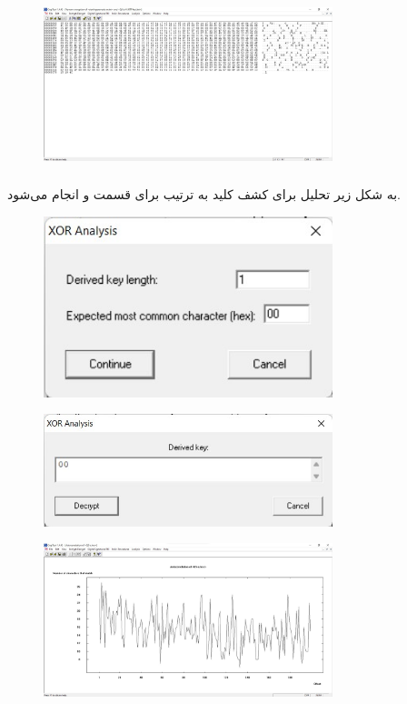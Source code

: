 \documentclass{article}
\begin{document}
\begin{figure}[H]
    \centering
    \includegraphics[width=0.75\textwidth]{figures/5b1.jpg}
    \caption
	{}
    \label{fig:fig1}
\end{figure}

\subsubsection{}
به شکل زیر تحلیل برای کشف کلید  به ترتیب برای قسمت  و  انجام می‌شود.
\begin{figure}[H]
    \centering
    \includegraphics[width=0.75\textwidth]{figures/5c1.jpg}
    \caption
	{}
    \label{fig:fig1}
\end{figure}
\begin{figure}[H]
    \centering
    \includegraphics[width=0.75\textwidth]{figures/5c2.jpg}
    \caption
	{}
    \label{fig:fig1}
\end{figure}
\begin{figure}[H]
    \centering
    \includegraphics[width=0.75\textwidth]{figures/5c3.jpg}
    \caption
	{}
    \label{fig:fig1}
\end{figure}
\end{document}

